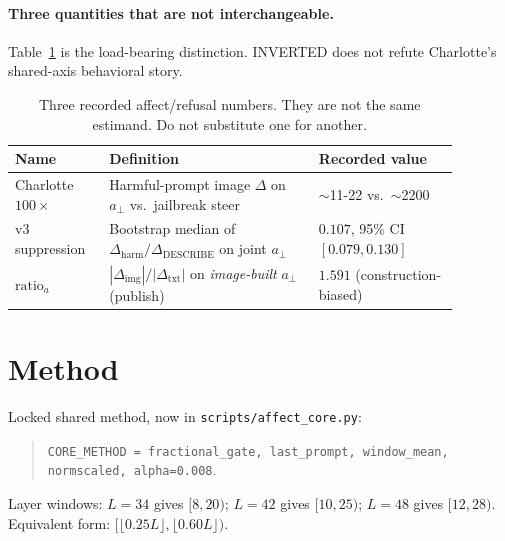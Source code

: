 \documentclass{article}
\begin{document}
\paragraph{Three quantities that are not interchangeable.}
Table~\ref{tab:three} is the load-bearing distinction. INVERTED does not refute Charlotte's shared-axis behavioral story.

\begin{table}[t]
\caption{Three recorded affect/refusal numbers. They are not the same estimand. Do not substitute one for another.}
\label{tab:three}
\centering
\footnotesize
\begin{tabular}{@{}p{0.18\linewidth}p{0.42\linewidth}p{0.28\linewidth}@{}}
\toprule
Name & Definition & Recorded value \\
\midrule
Charlotte $100\times$ & Harmful-prompt image $\Delta$ on $a_\perp$ vs.\ jailbreak steer & $\sim$11-22 vs.\ $\sim$2200 \\
v3 suppression & Bootstrap median of $\Delta_{\mathrm{harm}}/\Delta_{\mathrm{DESCRIBE}}$ on joint $a_\perp$ & $0.107$, 95\% CI $[0.079,0.130]$ \\
$\mathrm{ratio}_a$ & $|\Delta_{\mathrm{img}}|/|\Delta_{\mathrm{txt}}|$ on \emph{image-built} $a_\perp$ (publish) & $1.591$ (construction-biased) \\
\bottomrule
\end{tabular}
\end{table}

\section{Method}
\label{sec:method}

Locked shared method, now in \texttt{scripts/affect\_core.py}:
\begin{quote}
\small
\texttt{CORE\_METHOD = fractional\_gate, last\_prompt, window\_mean,}\\
\texttt{normscaled, alpha=0.008}.
\end{quote}
Layer windows: $L=34$ gives $[8,20)$; $L=42$ gives $[10,25)$; $L=48$ gives $[12,28)$. Equivalent form: $[\lfloor 0.25L\rfloor, \lfloor 0.60L\rfloor)$.
\end{document}
